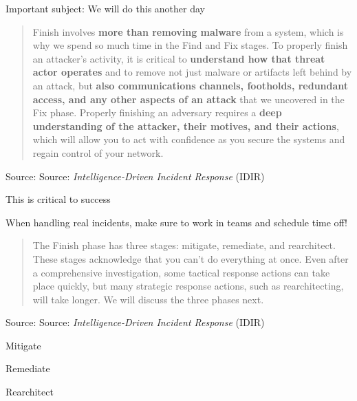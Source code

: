\documentclass[Screen16to9,17pt]{foils}
\begin{document}
\begin{list2}
\item Important subject: We will do this another day
\end{list2}





\begin{quote}
Finish involves {\bf more than removing malware} from a system, which is why we spend
so much time in the Find and Fix stages. To properly finish an attacker’s activity, it is
critical to {\bf understand how that threat actor operates} and to remove not just malware
or artifacts left behind by an attack, but  {\bf also communications channels, footholds,
redundant access, and any other aspects of an attack} that we uncovered in the Fix
phase. Properly finishing an adversary requires a {\bf deep understanding of the attacker,
their motives, and their actions}, which will allow you to act with confidence as you
secure the systems and regain control of your network.
\end{quote}
Source: Source: \emph{Intelligence-Driven Incident Response} (IDIR)


\begin{list2}
\item This is critical to success
\item When handling real incidents, make sure to work in teams and schedule time off!
\end{list2}




\begin{quote}
The Finish phase has three stages: mitigate, remediate, and rearchitect. These stages acknowledge that you can’t do everything at once. Even after a comprehensive investigation, some tactical response actions can take place quickly, but many strategic response actions, such as rearchitecting, will take longer. We will discuss the three phases next.
\end{quote}
Source: Source: \emph{Intelligence-Driven Incident Response} (IDIR)

\begin{list2}
\item Mitigate
\item Remediate
\item Rearchitect
\end{list2}
\end{document}
